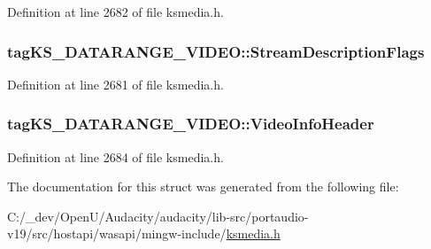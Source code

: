 Definition at line 2682 of file ksmedia.\+h.

\subsubsection[{\texorpdfstring{Stream\+Description\+Flags}{StreamDescriptionFlags}}]{ tag\+K\+S\+\_\+\+D\+A\+T\+A\+R\+A\+N\+G\+E\+\_\+\+V\+I\+D\+E\+O\+::\+Stream\+Description\+Flags}\hypertarget{structtag_k_s___d_a_t_a_r_a_n_g_e___v_i_d_e_o_a260342ce186439e8206e025862a624e8}{}\label{structtag_k_s___d_a_t_a_r_a_n_g_e___v_i_d_e_o_a260342ce186439e8206e025862a624e8}


Definition at line 2681 of file ksmedia.\+h.

\subsubsection[{\texorpdfstring{Video\+Info\+Header}{VideoInfoHeader}}]{ tag\+K\+S\+\_\+\+D\+A\+T\+A\+R\+A\+N\+G\+E\+\_\+\+V\+I\+D\+E\+O\+::\+Video\+Info\+Header}\hypertarget{structtag_k_s___d_a_t_a_r_a_n_g_e___v_i_d_e_o_a2ef910ad134685bafb37f9ef2ea6e1c9}{}\label{structtag_k_s___d_a_t_a_r_a_n_g_e___v_i_d_e_o_a2ef910ad134685bafb37f9ef2ea6e1c9}


Definition at line 2684 of file ksmedia.\+h.



The documentation for this struct was generated from the following file\+:\begin{DoxyCompactItemize}
\item 
C\+:/\+\_\+dev/\+Open\+U/\+Audacity/audacity/lib-\/src/portaudio-\/v19/src/hostapi/wasapi/mingw-\/include/\hyperlink{ksmedia_8h}{ksmedia.\+h}\end{DoxyCompactItemize}
